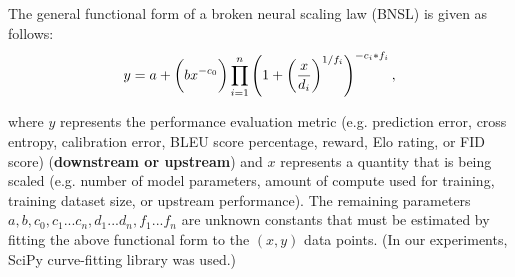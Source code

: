 \documentclass{article} %
\begin{document}

\vspace{-2.2mm}

The general functional form of a broken neural scaling law (BNSL) is given as follows:
\begin{equation}
\vspace{-0.05in}
y =  a + \bigg(bx^{-c_0}\bigg) \prod_{i=1}^n \left(1 + \left(\frac{x}{d_i}\right)^{1/f_i}\right)^{-c_i * f_i},
\label{eq:BNSL}
\end{equation}

where $y$ represents the performance evaluation metric (e.g. prediction error, cross entropy, calibration error, BLEU score percentage, reward, Elo rating, or FID score) (\textbf{downstream or upstream}) and $x$ represents a quantity that is being scaled (e.g. number of model parameters, amount of compute used for training, training dataset size, or upstream performance). The remaining  parameters %
$a, b, c_0, c_1 ... c_n, d_1 ...  d_n, f_1 ... f_n$
are unknown constants that must be estimated by fitting the above functional form to the $(x,y)$ data points. (In our experiments,  SciPy curve-fitting library \citep{virtanen2020scipy} was used.) 
\end{document}

